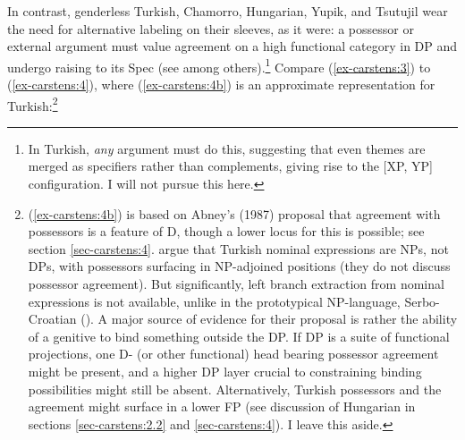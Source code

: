 \documentclass[output=paper
,modfonts
,nonflat]{langsci/langscibook}
\begin{document}
In contrast, genderless Turkish, Chamorro, Hungarian, Yupik, and Tsutujil wear the need for alternative labeling on their sleeves, as it were: a possessor or external argument must value agreement on a high functional category in DP and undergo raising to its Spec (see \citealt{Abney1987} among others).\footnote{In Turkish, \textit{any} argument must do this, suggesting that even themes are merged as specifiers rather than complements, giving rise to the [XP, YP] configuration. I will not pursue this here.} Compare (\ref{ex-carstens:3}) to (\ref{ex-carstens:4}), where (\ref{ex-carstens:4b}) is an approximate representation for Turkish:\footnote{(\ref{ex-carstens:4b}) is based on Abney's (1987) proposal that agreement with possessors is a feature of D, though a lower locus for this is possible; see section \ref{sec-carstens:4}. \citet{Boskovic_Sener2014} argue that Turkish nominal expressions are NPs, not DPs, with possessors surfacing in NP-adjoined positions (they do not discuss possessor agreement). But significantly, left branch extraction from nominal expressions is not available, unlike in the prototypical NP-language, Serbo-Croatian (\citealt{Boskovic2005}). A major source of evidence for their proposal is rather the ability of a genitive to bind something outside the DP. If DP is a suite of functional projections, one D- (or other functional) head bearing possessor agreement might be present, and a higher DP layer crucial to constraining binding possibilities might still be absent. Alternatively, Turkish possessors and the agreement might surface in a lower FP (see discussion of Hungarian in sections \ref{sec-carstens:2.2} and \ref{sec-carstens:4}). I leave this aside.}
\end{document}
